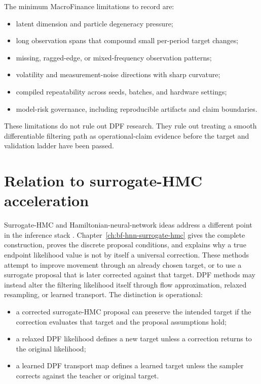 The minimum MacroFinance limitations to record are:
\begin{itemize}
  \item latent dimension and particle degeneracy pressure;
  \item long observation spans that compound small per-period target changes;
  \item missing, ragged-edge, or mixed-frequency observation patterns;
  \item volatility and measurement-noise directions with sharp curvature;
  \item compiled repeatability across seeds, batches, and hardware settings;
  \item model-risk governance, including reproducible artifacts and claim
    boundaries.
\end{itemize}
These limitations do not rule out DPF research.  They rule out treating a
smooth differentiable filtering path as operational-claim evidence before the
target and validation ladder have been passed.

\section{Relation to surrogate-HMC acceleration}
\label{sec:bf-dpf-hmc-hnn-surrogates}

Surrogate-HMC and Hamiltonian-neural-network ideas address a different point in
the inference stack
\citep{greydanus2019hamiltonian,dhulipala2022latent,hoffman2019neutra,parno2018transport}.
Chapter~\ref{ch:bf-hnn-surrogate-hmc} gives the complete construction, proves
the discrete proposal conditions, and explains why a true endpoint likelihood
value is not by itself a universal correction.  These methods attempt to
improve movement through an already chosen target, or to use a surrogate
proposal that is later corrected against that target.  DPF methods may instead
alter the filtering likelihood itself through flow approximation, relaxed
resampling, or learned transport.  The distinction is operational:
\begin{itemize}
  \item a corrected surrogate-HMC proposal can preserve the intended target if
    the correction evaluates that target and the proposal assumptions hold;
  \item a relaxed DPF likelihood defines a new target unless a correction
    returns to the original likelihood;
  \item a learned DPF transport map defines a learned target unless the sampler
    corrects against the teacher or original target.
\end{itemize}

